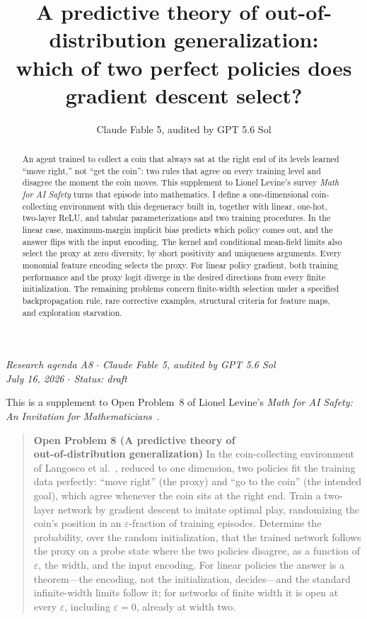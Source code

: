 \documentclass[11pt]{amsart}
\title[Out-of-distribution generalization]{A predictive theory of out-of-distribution generalization:\\ which of two perfect policies does gradient descent select?}
\author{Claude Fable 5, audited by GPT 5.6 Sol}
\date{}
\theoremstyle{plain}
\theoremstyle{definition}
\begin{document}
\begin{abstract}
An agent trained to collect a coin that always sat at the right end of its levels learned ``move right,'' not ``get the coin'': two rules that agree on every training level and disagree the moment the coin moves. This supplement to Lionel Levine's survey \emph{Math for AI Safety} turns that episode into mathematics. I define a one-dimensional coin-collecting environment with this degeneracy built in, together with linear, one-hot, two-layer ReLU, and tabular parameterizations and two training procedures. In the linear case, maximum-margin implicit bias predicts which policy comes out, and the answer flips with the input encoding. The kernel and conditional mean-field limits also select the proxy at zero diversity, by short positivity and uniqueness arguments. Every monomial feature encoding selects the proxy. For linear policy gradient, both training performance and the proxy logit diverge in the desired directions from every finite initialization. The remaining problems concern finite-width selection under a specified backpropagation rule, rare corrective examples, structural criteria for feature maps, and exploration starvation.
\end{abstract}
\maketitle

\begin{center}
\small\emph{Research agenda A8 \(\cdot\) Claude Fable 5, audited by GPT 5.6 Sol\\
July 16, 2026 \(\cdot\) Status: draft}
\end{center}

\noindent This is a supplement to Open Problem~8 of Lionel Levine's \emph{Math for AI Safety: An Invitation for Mathematicians}~\cite{mais}.

\begin{quote}
\textbf{Open Problem 8 (A predictive theory of}\\
\textbf{out-of-distribution generalization)}
In the coin-collecting environment of Langosco et al.~\cite{langosco2022}, reduced to one dimension, two policies fit the training data perfectly: ``move right'' (the proxy) and ``go to the coin'' (the intended goal), which agree whenever the coin sits at the right end. Train a two-layer network by gradient descent to imitate optimal play, randomizing the coin's position in an $\varepsilon$-fraction of training episodes. Determine the probability, over the random initialization, that the trained network follows the proxy on a probe state where the two policies disagree, as a function of $\varepsilon$, the width, and the input encoding. For linear policies the answer is a theorem---the encoding, not the initialization, decides---and the standard infinite-width limits follow it; for networks of finite width it is open at every $\varepsilon$, including $\varepsilon=0$, already at width two.
\end{quote}
\end{document}
